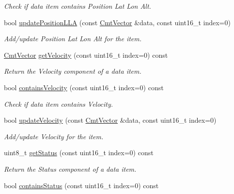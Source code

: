 \begin{DoxyCompactItemize}
\begin{DoxyCompactList}\small\item\em \-Check if data item contains \-Position \-Lat \-Lon \-Alt. \end{DoxyCompactList}\item 
\hypertarget{classxsens_1_1Packet_a6050b52eb25167f3bc4399be22e47846}{bool \hyperlink{classxsens_1_1Packet_a6050b52eb25167f3bc4399be22e47846}{update\-Position\-L\-L\-A} (const \hyperlink{structCmtVector}{\-Cmt\-Vector} \&data, const uint16\-\_\-t index=0)}\label{classxsens_1_1Packet_a6050b52eb25167f3bc4399be22e47846}

\begin{DoxyCompactList}\small\item\em \-Add/update \-Position \-Lat \-Lon \-Alt for the item. \end{DoxyCompactList}\item 
\hyperlink{structCmtVector}{\-Cmt\-Vector} \hyperlink{classxsens_1_1Packet_ad3307367ff105597704e039294699421}{get\-Velocity} (const uint16\-\_\-t index=0) const 
\begin{DoxyCompactList}\small\item\em \-Return the \-Velocity component of a data item. \end{DoxyCompactList}\item 
\hypertarget{classxsens_1_1Packet_a81915ae2bda08491e930dcace46fe792}{bool \hyperlink{classxsens_1_1Packet_a81915ae2bda08491e930dcace46fe792}{contains\-Velocity} (const uint16\-\_\-t index=0) const }\label{classxsens_1_1Packet_a81915ae2bda08491e930dcace46fe792}

\begin{DoxyCompactList}\small\item\em \-Check if data item contains \-Velocity. \end{DoxyCompactList}\item 
\hypertarget{classxsens_1_1Packet_ad9d914c068f345ef1e7dac129a63af5e}{bool \hyperlink{classxsens_1_1Packet_ad9d914c068f345ef1e7dac129a63af5e}{update\-Velocity} (const \hyperlink{structCmtVector}{\-Cmt\-Vector} \&data, const uint16\-\_\-t index=0)}\label{classxsens_1_1Packet_ad9d914c068f345ef1e7dac129a63af5e}

\begin{DoxyCompactList}\small\item\em \-Add/update \-Velocity for the item. \end{DoxyCompactList}\item 
uint8\-\_\-t \hyperlink{classxsens_1_1Packet_a569ff365dde6d7e0c95d742be4a0983b}{get\-Status} (const uint16\-\_\-t index=0) const 
\begin{DoxyCompactList}\small\item\em \-Return the \-Status component of a data item. \end{DoxyCompactList}\item 
\hypertarget{classxsens_1_1Packet_a375d056b4dc8bacb8e8a612e53097141}{bool \hyperlink{classxsens_1_1Packet_a375d056b4dc8bacb8e8a612e53097141}{contains\-Status} (const uint16\-\_\-t index=0) const }\label{classxsens_1_1Packet_a375d056b4dc8bacb8e8a612e53097141}


\end{DoxyCompactItemize}
